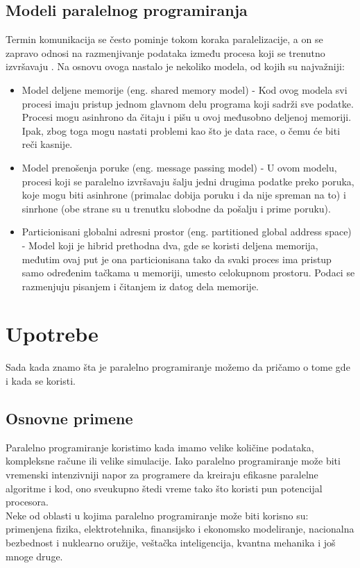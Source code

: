 \documentclass[a4paper]{article}
\begin{document}
\subsection{Modeli paralelnog programiranja}
Termin komunikacija se često pominje tokom koraka paralelizacije, a on se zapravo odnosi na razmenjivanje podataka između procesa koji se trenutno izvršavaju \cite{models}. Na osnovu ovoga nastalo je nekoliko modela, od kojih su najvažniji: \\
\begin{itemize}
\item Model deljene memorije (eng. shared memory model) - Kod ovog modela svi procesi imaju pristup jednom glavnom delu programa koji sadrži sve podatke. Procesi mogu asinhrono da čitaju i pišu u ovoj međusobno deljenoj memoriji. Ipak, zbog toga mogu nastati problemi kao što je data race, o čemu će biti reči kasnije.
\item Model prenošenja poruke (eng. message passing model) - U ovom modelu, procesi koji se paralelno izvršavaju šalju jedni drugima podatke preko poruka, koje mogu biti asinhrone (primalac dobija poruku i da nije spreman na to) i sinrhone (obe strane su u trenutku slobodne da pošalju i prime poruku).
\item Particionisani globalni adresni prostor (eng. partitioned global address space) - Model koji je hibrid prethodna dva, gde se koristi deljena memorija, međutim ovaj put je ona particionisana tako da svaki proces ima pristup samo određenim tačkama u memoriji, umesto celokupnom prostoru. Podaci se razmenjuju pisanjem i čitanjem iz datog dela memorije.
\end{itemize}
	
	\section{Upotrebe}
Sada kada znamo šta je paralelno programiranje možemo da pričamo o tome gde i kada se koristi.
\subsection{Osnovne primene}

Paralelno programiranje koristimo kada imamo velike količine podataka, kompleksne račune ili velike simulacije. Iako paralelno programiranje može biti vremenski intenzivniji napor za programere da kreiraju efikasne paralelne algoritme i kod, ono sveukupno štedi vreme tako što koristi pun potencijal procesora.\\Neke od oblasti u kojima paralelno programiranje može biti korisno su: primenjena fizika, elektrotehnika, finansijsko i ekonomsko modeliranje,  nacionalna bezbednost i nuklearno oružije, veštačka inteligencija, kvantna mehanika\cite{totalview} i još mnoge druge.
\end{document}
